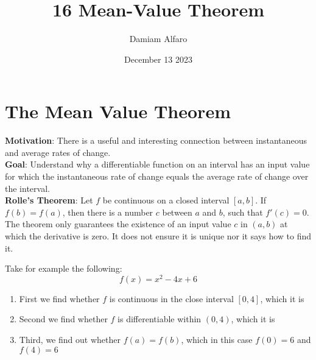 \documentclass[12pt, letterpaper]{article}
\title{16 Mean-Value Theorem}
\author{Damiam Alfaro}
\date{December 13 2023}
\begin{document}
\maketitle

\section{The Mean Value Theorem}
\textbf{Motivation}: There is a useful and interesting connection between instantaneous and average rates of change.\\
\newline
\textbf{Goal}: Understand why a differentiable function on an interval has an input value for which the instantaneous rate of change equals the average rate of change over the interval.\\
\newline
\textbf{Rolle's Theorem}: Let \(f\) be continuous on a closed interval \([a,b]\). If \(f(b) = f(a)\), then there is a number \(c\) between \(a\) and \(b\), such that \(f'(c)=0\). The theorem only guarantees the existence of an input value \(c\) in \((a,b)\) at which the derivative is zero. It does not ensure it is unique nor it says how to find it.
\begin{center}
\end{center}
Take for example the following:
\[f(x)=x^2-4x+6\]
\begin{enumerate}
    \item First we find whether \(f\) is continuous in the close interval \([0,4]\), which it is
    \item Second we find whether \(f\) is differentiable within \((0,4)\), which it is
    \item Third, we find out whether \(f(a) = f(b)\), which in this case \(f(0) = 6\) and \(f(4) = 6\)
\end{enumerate}
\end{document}
